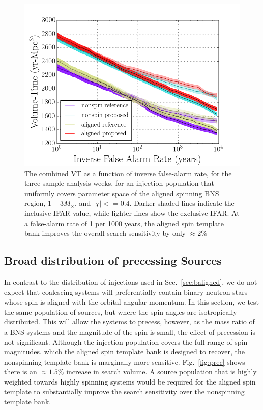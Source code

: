 \begin{figure}
\centering
\includegraphics[width=1.0\textwidth]{papers/bns_o1_dev/figures/aligned_combined.png}
\caption{\label{fig:aligned} 
The combined VT as a function of inverse false-alarm rate, for the
three sample analysis weeks, for an injection population that uniformly covers parameter space of the aligned spinning BNS region, $1- 3M_\odot$, and $|\chi| <= 0.4$. Darker shaded lines indicate the inclusive IFAR value, while lighter lines show the exclusive IFAR. At a false-alarm rate of 1 per 1000 years, the aligned spin template bank improves the overall search sensitivity by only $\approx 2\%$
}
\end{figure}

\subsection{Broad distribution of precessing Sources}

In contrast to the distribution of injections used in Sec.~\ref{sec:baligned}, we do not expect that coalescing systems will preferentially contain binary neutron stars whose spin is aligned with the orbital angular momentum. In this section, we test the same population of sources, but where the spin angles are isotropically distributed. This will allow the systems to precess, however, as the mass ratio of a BNS systems and the magnitude of the spin is small, the effect of precession is not significant. Although the injection population covers the full range of spin magnitudes, which the aligned spin template bank is designed to recover, the nonspinning template bank is marginally more sensitive. Fig.~\ref{fig:prec} shows there is an $\approx 1.5\%$ increase in search volume. A source population that is highly weighted towards highly spinning systems would be required for the aligned spin template to substantially improve the search sensitivity over the nonspinning template bank. 

